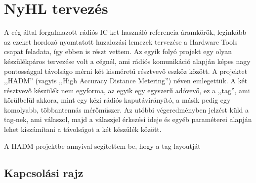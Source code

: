 \documentclass[a4paper,12pt,titlepage]{article}
\begin{document}
   \section{NyHL tervezés}
        A cég által forgalmazott rádiós IC-ket használó referencia-áramkörök, leginkább az ezeket hordozó nyomtatott huzalozási lemezek tervezése a Hardware Tools csapat feladata, így ebben is részt vettem. Az egyik folyó projekt egy olyan készülékpáros tervezése volt a cégnél, ami rádiós komunikáció alapján képes nagy pontossággal távolságo mérni két kisméretű résztvevő eszköz között. A projektet ,,HADM'' (vagyis ,,High Accuracy Distance Metering'') néven emlegettük. A két résztvevő készülék nem egyforma, az egyik egy egyszerű adóvevő, ez a ,,tag'', ami körülbelül akkora, mint egy kézi rádiós kaputávirányító, a másik pedig egy komolyabb, többantennás mérőműszer. Az utóbbi végeredményben jelzést küld a tag-nek, ami válaszol, majd a válaszjel érkezési ideje és egyéb paraméterei alapján lehet kiszámítani a távolságot a két készülék között.
        \par
        A HADM projektbe annyival segítettem be, hogy a tag layoutját
        \subsection{Kapcsolási rajz}
\end{document}
